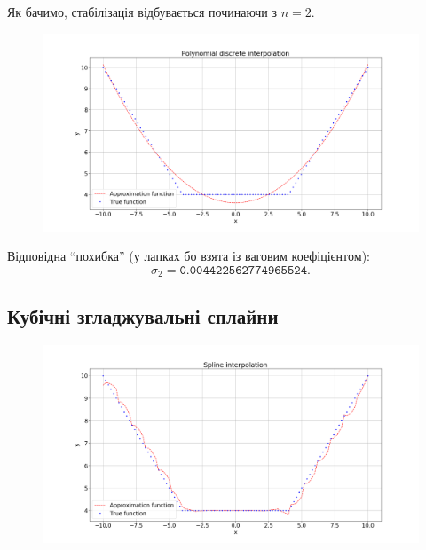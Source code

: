 Як бачимо, стабілізація відбувається починаючи з $n = 2$.

\begin{figure}[H]
    \centering
    \includegraphics[width=\textwidth]{4.png}
\end{figure}

Відповідна ``похибка'' (у лапках бо взята із ваговим коефіцієнтом): \[ \sigma_2 = \texttt{0.004422562774965524}. \]

\subsection{Кубічні згладжувальні сплайни}

\begin{figure}[H]
    \centering
    \includegraphics[width=\textwidth]{5.png}
\end{figure}


